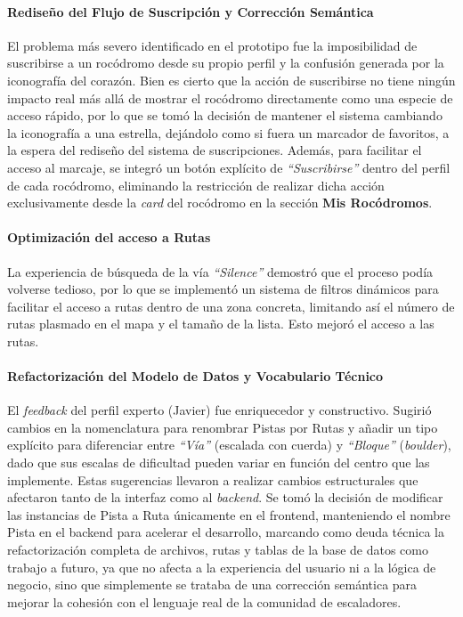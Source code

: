 \paragraph{Rediseño del Flujo de Suscripción y Corrección Semántica}
El problema más severo identificado en el prototipo fue la imposibilidad de suscribirse a un rocódromo desde su propio perfil y la confusión generada por la iconografía del corazón. Bien es cierto que la acción de suscribirse no tiene ningún impacto real más allá de mostrar el rocódromo directamente como una especie de acceso rápido, por lo que se tomó la decisión de mantener el sistema cambiando la iconografía a una estrella, dejándolo como si fuera un marcador de favoritos, a la espera del rediseño del sistema de suscripciones. Además, para facilitar el acceso al marcaje, se integró un botón explícito de \textit{``Suscribirse''} dentro del perfil de cada rocódromo, eliminando la restricción de realizar dicha acción exclusivamente desde la \textit{card} del rocódromo en la sección \textbf{Mis Rocódromos}. 

\paragraph{Optimización del acceso a Rutas}
La experiencia de búsqueda de la vía \textit{``Silence''} demostró que el proceso podía volverse tedioso, por lo que se implementó un sistema de filtros dinámicos para facilitar el acceso a rutas dentro de una zona concreta, limitando así el número de rutas plasmado en el mapa y el tamaño de la lista. Esto mejoró el acceso a las rutas.

\paragraph{Refactorización del Modelo de Datos y Vocabulario Técnico}
El \textit{feedback} del perfil experto (Javier) fue enriquecedor y constructivo. Sugirió cambios en la nomenclatura para renombrar Pistas por Rutas y añadir un tipo explícito para diferenciar entre \textit{``Vía''} (escalada con cuerda) y \textit{``Bloque''} (\textit{boulder}), dado que sus escalas de dificultad pueden variar en función del centro que las implemente. Estas sugerencias llevaron a realizar cambios estructurales que afectaron tanto de la interfaz como al \textit{backend}. Se tomó la decisión de modificar las instancias de Pista a Ruta únicamente en el frontend, manteniendo el nombre Pista en el backend para acelerar el desarrollo, marcando como deuda técnica la refactorización completa de archivos, rutas y tablas de la base de datos como trabajo a futuro, ya que no afecta a la experiencia del usuario ni a la lógica de negocio, sino que simplemente se trataba de una corrección semántica para mejorar la cohesión con el lenguaje real de la comunidad de escaladores.
    
